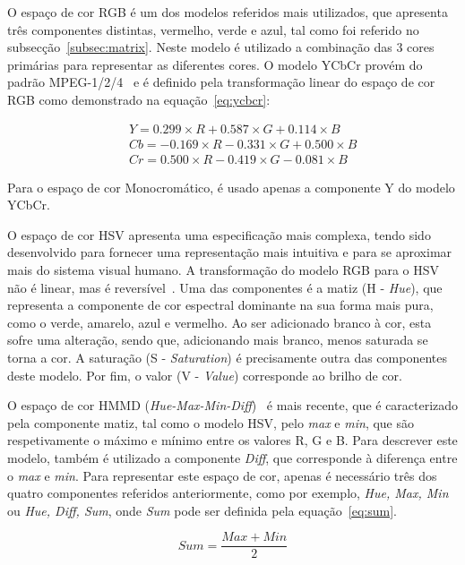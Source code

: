O espaço de cor RGB é um dos modelos referidos mais utilizados, que apresenta três componentes distintas, vermelho, verde e azul, tal como foi referido no subsecção~\ref{subsec:matrix}. Neste modelo é utilizado a combinação das 3 cores primárias para representar as diferentes cores. O modelo YCbCr provém do padrão MPEG-1/2/4~\cite{Ite-vil} e é definido pela transformação linear do espaço de cor RGB como demonstrado na equação~\ref{eq:ycbcr}:

\begin{eqnarray}
&& Y = 0.299\times R + 0.587\times G + 0.114\times B\nonumber\\
&& Cb = -0.169\times R - 0.331\times G + 0.500\times B \nonumber\\
&& Cr = 0.500\times R - 0.419\times G - 0.081\times B \label{eq:ycbcr}
\end{eqnarray} 

Para o espaço de cor Monocromático, é usado apenas a componente Y do modelo YCbCr. 

O espaço de cor HSV apresenta uma especificação mais complexa, tendo sido desenvolvido para fornecer uma representação mais intuitiva e para se aproximar mais do sistema visual humano. A transformação do modelo RGB para o HSV não é linear, mas é reversível~\cite{Manjunath2001}. Uma das componentes é a matiz (H - \textit{Hue}), que representa a componente de cor espectral dominante na sua forma mais pura, como o verde, amarelo, azul e vermelho. Ao ser adicionado branco à cor, esta sofre uma alteração, sendo que, adicionando mais branco, menos saturada se torna a cor. A saturação (S - \textit{Saturation}) é precisamente outra das componentes deste modelo. Por fim, o valor (V - \textit{Value}) corresponde ao brilho de cor.

O espaço de cor HMMD (\textit{Hue-Max-Min-Diff})~\cite{Manjunath2001, Ite-vil} é mais recente, que é caracterizado pela componente matiz, tal como o modelo HSV, pelo \textit{max} e \textit{min}, que são respetivamente o máximo e mínimo entre os valores R, G e B. Para descrever este modelo, também é utilizado a componente \textit{Diff}, que corresponde à diferença entre o \textit{max} e \textit{min}. Para representar este espaço de cor, apenas é necessário três dos quatro componentes referidos anteriormente, como por exemplo, {\textit{Hue, Max, Min}} ou {\textit{Hue, Diff, Sum}}, onde \textit{Sum} pode ser definida pela equação~\ref{eq:sum}.

\begin{equation}
Sum = \frac{Max + Min}{2}
\label{eq:sum}
\end{equation}

